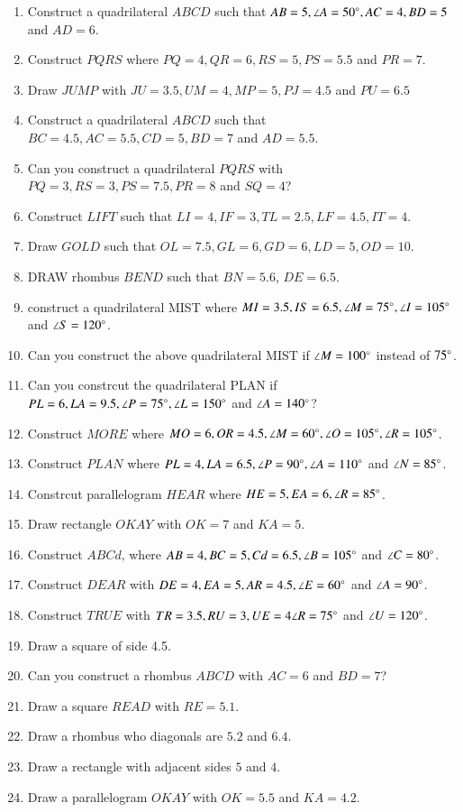 \begin{enumerate}[label=\arabic*.,ref=\thesubsection.\theenumi]
\item Construct a quadrilateral $ABCD$ such that $AB=5, \angle A = 50\degree, AC = 4, BD = 5$ and $AD = 6$.
\item Construct $PQRS$ where $PQ = 4, QR = 6, RS = 5, PS = 5.5$ and $PR = 7$.
\item Draw $JUMP$ with $JU = 3.5, UM=4, MP = 5, PJ =4.5$ and $PU = 6.5$
\item Construct a quadrilateral $ABCD$ such that $BC=4.5,  AC = 5.5, CD = 5, BD = 7$ and $AD = 5.5$.
\item Can you construct a quadrilateral $PQRS$ with $PQ=3, RS=3, PS=7.5, PR=8$ and $SQ=4$?
\item Construct $LIFT$ such that $LI = 4, IF = 3, TL = 2.5, LF = 4.5, IT=4$.
\item Draw $GOLD$ such that $OL=7.5, GL=6, GD=6, LD = 5, OD = 10$.
\item DRAW rhombus $BEND$ such that $BN = 5.6$, $DE = 6.5$.
\item construct a quadrilateral MIST where $MI = 3.5, IS = 6.5, \angle M = 75 \degree, \angle I = 105 \degree$ and $\angle S = 120 \degree$.
\item Can you construct the above quadrilateral MIST if $\angle M = 100 \degree$ instead of $75 \degree$.
\item Can you constrcut the quadrilateral PLAN if $PL = 6, LA = 9.5, \angle P = 75 \degree, \angle L = 150 \degree$ and $\angle A = 140 \degree$?
\item Construct $MORE$ where $MO = 6, OR = 4.5, \angle M = 60 \degree, \angle O = 105 \degree, \angle R = 105 \degree$.
\item Construct $PLAN$ where $PL = 4, LA = 6.5, \angle P = 90 \degree, \angle A = 110\degree$ and $\angle N = 85\degree$.
\item Constrcut parallelogram $HEAR$ where $HE = 5, EA = 6, \angle R = 85 \degree$.
\item Draw  rectangle $OKAY$ with $OK = 7$ and $KA = 5$.
\item Construct $ABCd $, where $AB = 4, BC = 5, Cd = 6.5, \angle B = 105 \degree$ and $\angle C = 80\degree$.
\item Construct $DEAR$ with $DE = 4, EA = 5, AR = 4.5, \angle E = 60 \degree$ and $\angle A = 90 \degree$.\item Construct $TRUE$ with $TR = 3.5, RU = 3, UE = 4 \angle R = 75\degree$ and $\angle U = 120\degree$.
\item Draw a square of side 4.5.

\item Can you construct a rhombus $ABCD$ with $AC = 6$ and $BD = 7$?
\item Draw a square $READ$ with $RE = 5.1$.
\item Draw a rhombus who diagonals are $5.2$ and $6.4$.
\item Draw a rectangle with adjacent sides $5$ and $4$.
\item Draw a parallelogram $OKAY$ with $OK = 5.5$ and $KA = 4.2$.


\end{enumerate}
%
